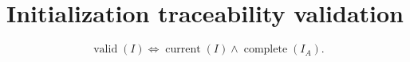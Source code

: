 \documentclass{article}
\begin{document}
\section*{Initialization traceability validation}
\label{validation:init-traceability}
\[
\operatorname{valid}(I)\iff\operatorname{current}(I)\land\operatorname{complete}(I_A).
\]
\end{document}
